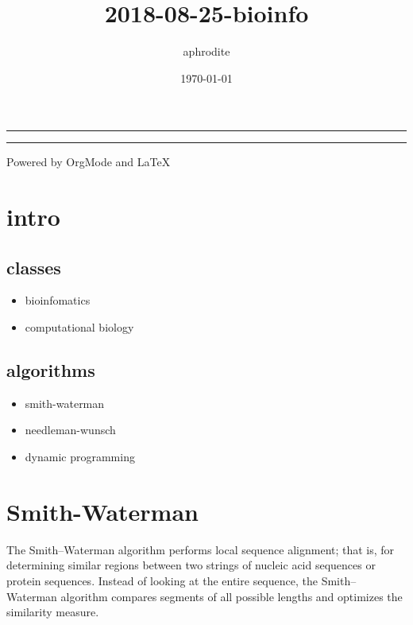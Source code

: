 \documentclass[a4paper]{article}
\author{aphrodite}
\date{\today}
\title{2018-08-25-bioinfo}
\begin{document}
\maketitle
\hrule
\begin{abstract}
\noindent
\vspace{3ex}
\end{abstract}
\tableofcontents
\vspace{3ex}
\hrule
\vspace{3ex}
\begin{center}
  \noindent Powered by OrgMode and LaTeX{}
\end{center}
\newpage

\section{intro}
\label{sec-1}
\subsection{classes}
\label{sec-1-1}
\begin{itemize}
\item bioinfomatics
\item computational biology
\end{itemize}

\subsection{algorithms}
\label{sec-1-2}
\begin{itemize}
\item smith-waterman
\item needleman-wunsch
\item dynamic programming
\end{itemize}

\section{Smith-Waterman}
\label{sec-2}
The Smith–Waterman algorithm performs local sequence alignment; that is, for determining similar regions between two strings of nucleic acid sequences or protein sequences.
Instead of looking at the entire sequence, the Smith–Waterman algorithm compares segments of all possible lengths and optimizes the similarity measure.
\end{document}
